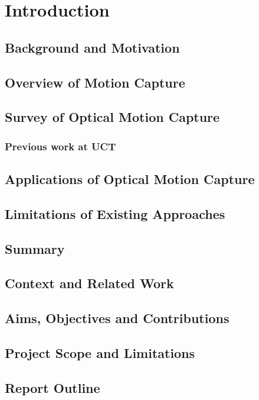 \chapter{Introduction}
\label{Introduction}

\section{Background and Motivation}
\section{Overview of Motion Capture}
\section{Survey of Optical Motion Capture}
\subsection{Previous work at UCT}
\section{Applications of Optical Motion Capture}
\section{Limitations of Existing Approaches}
\section{Summary}

\section{Context and Related Work}

\section{Aims, Objectives and Contributions}

\section{Project Scope and Limitations}

\section{Report Outline}